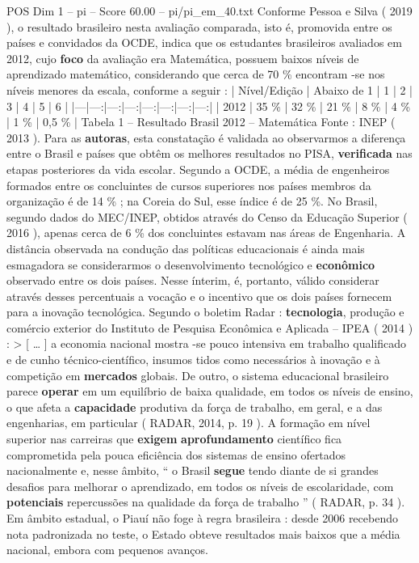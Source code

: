 \begin{textsample}{POS Dim 1 – pi – Score 60.00 – pi/pi\_em\_40.txt}
Conforme Pessoa e Silva ( 2019 ), o resultado brasileiro nesta avaliação comparada, isto é, promovida entre os países e convidados da OCDE, indica que os estudantes brasileiros avaliados em 2012, cujo \textbf{foco} da avaliação era Matemática, possuem baixos níveis de aprendizado matemático, considerando que cerca de 70 \% encontram -se nos níveis menores da escala, conforme a seguir : | Nível/Edição | Abaixo de 1 | 1 | 2 | 3 | 4 | 5 | 6 | |---|---:|---:|---:|---:|---:|---:|---:| | 2012 | 35 \% | 32 \% | 21 \% | 8 \% | 4 \% | 1 \% | 0,5 \% | Tabela 1 – Resultado Brasil 2012 – Matemática Fonte : INEP ( 2013 ).
Para as \textbf{autoras}, esta constatação é validada ao observarmos a diferença entre o Brasil e países que obtêm os melhores resultados no PISA, \textbf{verificada} nas etapas posteriores da vida escolar.
Segundo a OCDE, a média de engenheiros formados entre os concluintes de cursos superiores nos países membros da organização é de 14 \% ; na Coreia do Sul, esse índice é de 25 \%.
No Brasil, segundo dados do MEC/INEP, obtidos através do Censo da Educação Superior ( 2016 ), apenas cerca de 6 \% dos concluintes estavam nas áreas de Engenharia.
A distância observada na condução das políticas educacionais é ainda mais esmagadora se considerarmos o desenvolvimento tecnológico e \textbf{econômico} observado entre os dois países.
Nesse ínterim, é, portanto, válido considerar através desses percentuais a vocação e o incentivo que os dois países fornecem para a inovação tecnológica.
Segundo o boletim Radar : \textbf{tecnologia}, produção e comércio exterior do Instituto de Pesquisa Econômica e Aplicada – IPEA ( 2014 ) : > [ … ] a economia nacional mostra -se pouco intensiva em trabalho qualificado e de cunho técnico-científico, insumos tidos como necessários à inovação e à competição em \textbf{mercados} globais.
De outro, o sistema educacional brasileiro parece \textbf{operar} em um equilíbrio de baixa qualidade, em todos os níveis de ensino, o que afeta a \textbf{capacidade} produtiva da força de trabalho, em geral, e a das engenharias, em particular ( RADAR, 2014, p. 19 ).
A formação em nível superior nas carreiras que \textbf{exigem} \textbf{aprofundamento} científico fica comprometida pela pouca eficiência dos sistemas de ensino ofertados nacionalmente e, nesse âmbito, “ o Brasil \textbf{segue} tendo diante de si grandes desafios para melhorar o aprendizado, em todos os níveis de escolaridade, com \textbf{potenciais} repercussões na qualidade da força de trabalho ” ( RADAR, p. 34 ).
Em âmbito estadual, o Piauí não foge à regra brasileira : desde 2006 recebendo nota padronizada no teste, o Estado obteve resultados mais baixos que a média nacional, embora com pequenos avanços.

\end{textsample}
